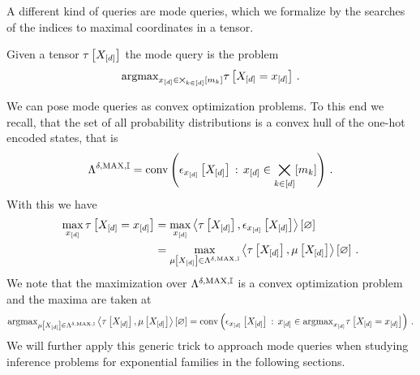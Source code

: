\label{sec:modeQueries}

A different kind of queries are mode queries, which we formalize by the searches of the indices to maximal coordinates in a tensor.

\begin{definition}
    Given a tensor $\tau\left[X_{[d]}\right]$ the mode query is the problem
    \begin{align}
        \mathrm{argmax}_{x_{[d]}\in\bigtimes_{k\in[d]}[m_{k}]} \tau\left[X_{[d]}=x_{[d]}\right] \, .
    \end{align}
\end{definition}


We can pose mode queries as convex optimization problems.
To this end we recall, that the set of all probability distributions is a convex hull of the one-hot encoded states, that is
\begin{align*}
    \Lambda^{\delta,\mathrm{MAX},\mathbb{I}}
    = \mathrm{conv}\left(\epsilon_{x_{[d]}}\left[X_{[d]}\right]\,:\,x_{[d]}\in\bigtimes_{k\in[d]}[m_{k}]\right) \, .
\end{align*}
With this we have
\begin{align*}
    \max_{x_{[d]}} \tau\left[X_{[d]}=x_{[d]}\right]
    &= \max_{x_{[d]}} \left\langle \tau\left[X_{[d]}\right],\epsilon_{x_{[d]}}\left[X_{[d]}\right]\right\rangle \left[ \varnothing \right] \\
    &= \max_{\mu\left[X_{[d]}\right]\in\Lambda^{\delta,\mathrm{MAX},\mathbb{I}}} \left\langle \tau\left[X_{[d]}\right],\mu\left[X_{[d]}\right]\right\rangle \left[ \varnothing \right] \, .
\end{align*}
We note that the maximization over $\Lambda^{\delta,\mathrm{MAX},\mathbb{I}}$ is a convex optimization problem and the maxima are taken at
\begin{align*}
    \mathrm{argmax}_{\mu\left[X_{[d]}\right]\in\Lambda^{\delta,\mathrm{MAX},\mathbb{I}}} \left\langle \tau\left[X_{[d]}\right],\mu\left[X_{[d]}\right]\right\rangle \left[ \varnothing \right]
    = \mathrm{conv}\left(\epsilon_{x_{[d]}}\left[X_{[d]}\right]\,:\,x_{[d]}\in\mathrm{argmax}_{x_{[d]}} \tau\left[X_{[d]}=x_{[d]}\right]\right) \, .
\end{align*}
We will further apply this generic trick to approach mode queries when studying inference problems for exponential families in the following sections.


